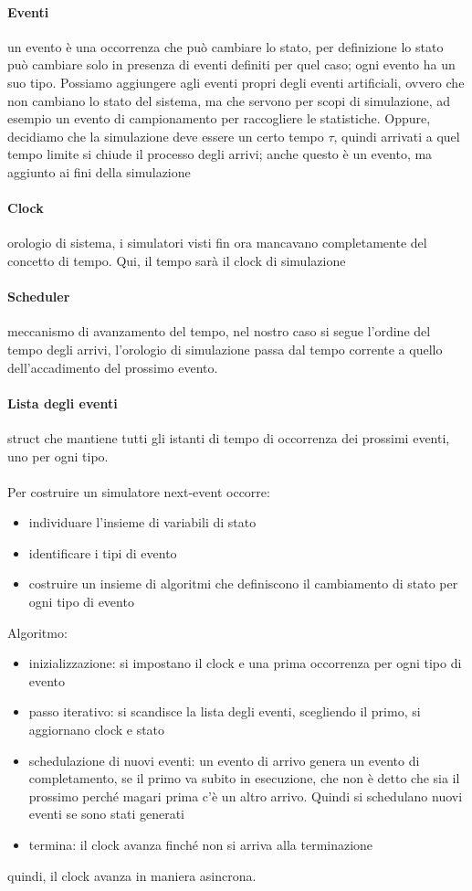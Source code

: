 \documentclass{article}
\begin{document}
\paragraph{Eventi}un evento è una occorrenza che può cambiare lo stato, per definizione lo stato può cambiare solo in presenza di eventi definiti per quel caso; ogni evento ha un suo tipo. Possiamo aggiungere agli eventi propri degli eventi artificiali, ovvero che non cambiano lo stato del sistema, ma che servono per scopi di simulazione, ad esempio un evento di campionamento per raccogliere le statistiche. Oppure, decidiamo che la simulazione deve essere un certo tempo $\tau$, quindi arrivati a quel tempo limite si chiude il processo degli arrivi; anche questo è un evento, ma aggiunto ai fini della simulazione
\paragraph{Clock}orologio di sistema, i simulatori visti fin ora mancavano completamente del concetto di tempo. Qui, il tempo sarà il clock di simulazione
\paragraph{Scheduler}meccanismo di avanzamento del tempo, nel nostro caso si segue l'ordine del tempo degli arrivi, l'orologio di simulazione passa dal tempo corrente a quello dell'accadimento del prossimo evento.
\paragraph{Lista degli eventi}struct che mantiene tutti gli istanti di tempo di occorrenza dei prossimi eventi, uno per ogni tipo.
\\\\ Per costruire un simulatore next-event occorre:
\begin{itemize}
\item individuare l'insieme di variabili di stato
\item identificare i tipi di evento
\item costruire un insieme di algoritmi che definiscono il cambiamento di stato per ogni tipo di evento
\end{itemize}
Algoritmo:
\begin{itemize}
\item inizializzazione: si impostano il clock e una prima occorrenza per ogni tipo di evento
\item passo iterativo: si scandisce la lista degli eventi, scegliendo il primo, si aggiornano clock e stato
\item schedulazione di nuovi eventi: un evento di arrivo genera un evento di completamento, se il primo va subito in esecuzione, che non è detto che sia il prossimo perché magari prima c'è un altro arrivo. Quindi si schedulano nuovi eventi se sono stati generati
\item termina: il clock avanza finché non si arriva alla terminazione
\end{itemize}
quindi, il clock avanza in maniera asincrona.
\end{document}
